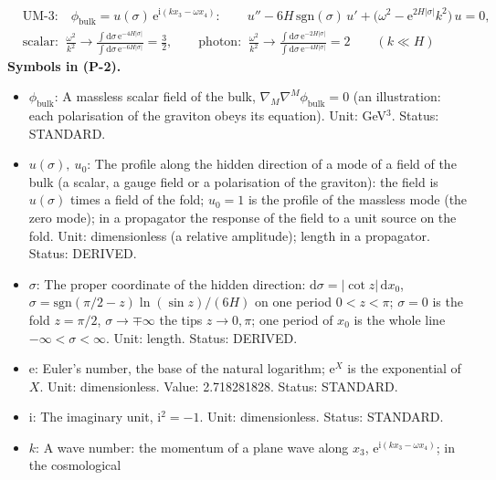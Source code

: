 \documentclass[
  10pt,
]{article}
\providecommand{\tightlist}{%
  \setlength{\itemsep}{0pt}\setlength{\parskip}{0pt}}
\begin{document}
\[
\begin{aligned}
&\text{UM-3:}\quad \phi_{\mathrm{bulk}} = u(\sigma)\,\mathrm{e}^{\mathrm{i}(kx_3 - \omega x_4)}:\qquad
 u'' - 6H\,\mathrm{sgn}(\sigma)\,u' + \big(\omega^2 - \mathrm{e}^{2H\lvert\sigma\rvert}k^2\big)\,u = 0,\\
&\text{scalar: }\ \frac{\omega^2}{k^2} \to \frac{\int\mathrm{d}\sigma\,\mathrm{e}^{-4H\lvert\sigma\rvert}}{\int\mathrm{d}\sigma\,\mathrm{e}^{-6H\lvert\sigma\rvert}} = \frac32,\qquad
 \text{photon: }\ \frac{\omega^2}{k^2} \to \frac{\int\mathrm{d}\sigma\,\mathrm{e}^{-2H\lvert\sigma\rvert}}{\int\mathrm{d}\sigma\,\mathrm{e}^{-4H\lvert\sigma\rvert}} = 2\qquad
 (k \ll H)
\end{aligned} \tag{P-2}
\] \textbf{Symbols in (P-2).}

\begin{itemize}
\tightlist
\item
  \(\phi_{\mathrm{bulk}}\): A massless scalar field of the bulk,
  \(\nabla_M\nabla^M\phi_{\mathrm{bulk}} = 0\) (an illustration: each
  polarisation of the graviton obeys its equation). Unit: GeV\(^3\).
  Status: STANDARD.
\item
  \(u(\sigma),\ u_0\): The profile along the hidden direction of a mode
  of a field of the bulk (a scalar, a gauge field or a polarisation of
  the graviton): the field is \(u(\sigma)\) times a field of the fold;
  \(u_0 = 1\) is the profile of the massless mode (the zero mode); in a
  propagator the response of the field to a unit source on the fold.
  Unit: dimensionless (a relative amplitude); length in a propagator.
  Status: DERIVED.
\item
  \(\sigma\): The proper coordinate of the hidden direction:
  \(\mathrm{d}\sigma = \lvert\cot z\rvert\,\mathrm{d}x_0\),
  \(\sigma = \mathrm{sgn}(\pi/2 - z)\ln(\sin z)/(6H)\) on one period
  \(0 < z < \pi\); \(\sigma = 0\) is the fold \(z = \pi/2\),
  \(\sigma \to \mp\infty\) the tips \(z \to 0, \pi\); one period of
  \(x_0\) is the whole line \(-\infty < \sigma < \infty\). Unit: length.
  Status: DERIVED.
\item
  \(\mathrm{e}\): Euler's number, the base of the natural logarithm;
  \(\mathrm{e}^{X}\) is the exponential of \(X\). Unit: dimensionless.
  Value: 2.718281828. Status: STANDARD.
\item
  \(\mathrm{i}\): The imaginary unit, \(\mathrm{i}^2 = -1\). Unit:
  dimensionless. Status: STANDARD.
\item
  \(k\): A wave number: the momentum of a plane wave along \(x_3\),
  \(\mathrm{e}^{\mathrm{i}(kx_3 - \omega x_4)}\); in the cosmological

\end{itemize}
\end{document}
